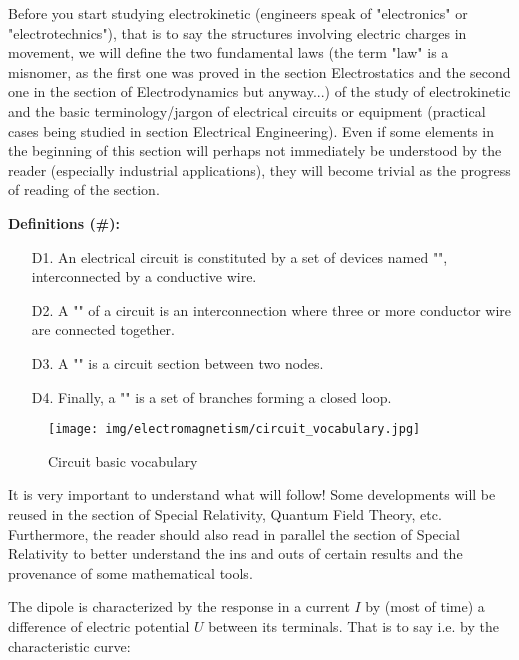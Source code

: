 	Before you start studying electrokinetic (engineers speak of "electronics" or "electrotechnics"), that is to say the structures involving electric charges in movement, we will define the two fundamental laws (the term "law" is a misnomer, as the first one was proved in the section Electrostatics and the second one in the section of Electrodynamics but anyway...) of the study of electrokinetic and the basic terminology/jargon of electrical circuits or equipment (practical cases being studied in section Electrical Engineering). Even if some elements in the beginning of this section will perhaps not immediately be understood by the reader (especially industrial applications), they will become trivial as the progress of reading of the section.
	
	\textbf{Definitions (\#\mydef):}
	\begin{enumerate}
		\item[D1.] An electrical circuit is constituted by a set of devices named "", interconnected by a conductive wire.
		
		\item[D2.] A "" of a circuit is an interconnection where three or more conductor wire are connected together.
		
		\item[D3.] A "" is a circuit section between two nodes.
		
		\item[D4.] Finally, a "" is a set of branches forming a closed loop.
	\end{enumerate}
	\begin{figure}[H]
		\centering
		\texttt{[image: img/electromagnetism/circuit\_vocabulary.jpg]}
		\caption{Circuit basic vocabulary}
	\end{figure}
	\begin{tcolorbox}[title=Remark,colframe=black,arc=10pt]
	It is very important to understand what will follow! Some developments will be reused in the section of Special Relativity, Quantum Field Theory, etc. Furthermore, the reader should also read in parallel the section of Special Relativity to better understand the ins and outs of certain results and the provenance of some mathematical tools.
	\end{tcolorbox}
	The dipole is characterized by the response in a current $I$ by (most of time) a difference of electric potential $U$ between its terminals. That is to say i.e. by the characteristic curve:
	
